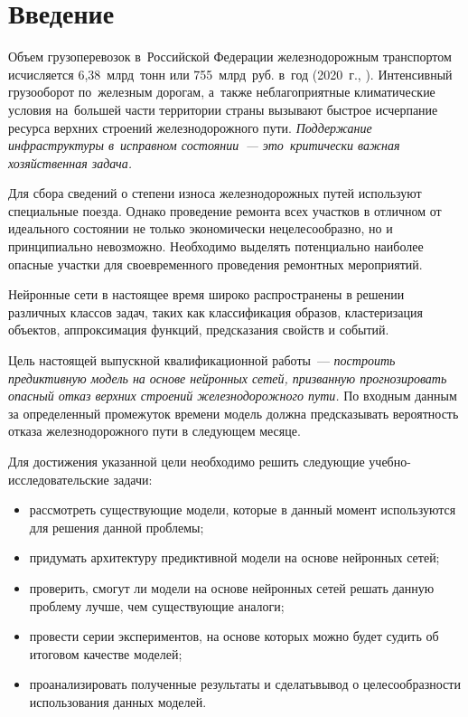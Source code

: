 \chapter*{Введение}

\vspace{-3mm}
Объем грузоперевозок в~Российской Федерации железнодорожным транспортом исчисляется 6,38~млрд~тонн или 755~млрд~руб. в~год (2020~г., \cite{seanews}).
Интенсивный грузооборот по~железным дорогам, а~также неблагоприятные климатические условия на~большей части
территории страны вызывают быстрое исчерпание ресурса верхних строений железнодорожного пути.
\emph{Поддержание инфраструктуры в~исправном состоянии~--- это~критически важная хозяйственная задача.}

Для сбора сведений о степени износа железнодорожных путей используют специальные поезда.
Однако проведение ремонта всех участков в отличном от идеального состоянии не только экономически нецелесообразно, но и принципиально невозможно.
Необходимо выделять потенциально наиболее опасные участки для своевременного проведения ремонтных мероприятий.

Нейронные сети в настоящее время широко распространены в решении различных классов задач, таких как классификация образов, кластеризация объектов, аппроксимация функций, предсказания свойств и событий.

Цель настоящей выпускной квалификационной работы~--- \emph{построить предиктивную модель на основе нейронных сетей,
призванную прогнозировать опасный отказ верхних строений железнодорожного пути.} По входным данным за
определенный промежуток времени модель должна предсказывать вероятность отказа железнодорожного
пути в следующем месяце.

Для достижения указанной цели необходимо решить следующие учебно-исследовательские задачи:
\begin{itemize}[itemsep=.5ex, wide]
	\item рассмотреть существующие модели, которые в данный момент используются для решения данной проблемы;
	\item придумать архитектуру предиктивной модели на основе нейронных сетей;
	\item проверить, смогут ли модели на основе нейронных сетей решать данную проблему лучше, чем существующие аналоги;
	\item провести серии экспериментов, на основе которых можно будет судить об итоговом качестве моделей;
	\item проанализировать полученные результаты и сделать\linebreak вывод о целесообразности использования данных моделей.
\end{itemize}

